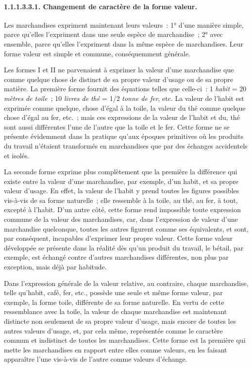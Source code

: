 \documentclass[french,twoside]{book} %
\begin{document}
\paragraph[{1.1.1.3.3.1. Changement de caractère de la forme valeur.}]{1.1.1.3.3.1. Changement de caractère de la forme valeur.}
\noindent Les marchandises expriment maintenant leurs valeurs : 1° d’une manière simple, parce qu’elles l’expriment dans une seule espèce de marchandise ; 2° avec ensemble, parce qu’elles l’expriment dans la même espèce de marchandises. Leur forme valeur est simple et commune, conséquemment générale.\par
Les formes I et II ne parvenaient à exprimer la valeur d’une marchandise que comme quelque chose de distinct de sa propre valeur d’usage ou de sa propre matière. La première forme fournit des équations telles que celle-ci : 1 \emph{habit} = 20 \emph{mètres de toile} ; 10 \emph{livres de thé} = 1/2 \emph{tonne de fer}, etc. La valeur de l’habit est exprimée comme quelque, chose d’égal à la toile, la valeur du thé comme quelque chose d’égal au fer, etc. ; mais ces expressions de la valeur de l’habit et du, thé sont aussi différentes l’une de l’autre que la toile et le fer. Cette forme ne se présente évidemment dans la pratique qu’aux époques primitives où les produits du travail n’étaient transformés en marchandises que par des échanges accidentels et isolés.\par
La seconde forme exprime plus complètement que la première la différence qui existe entre la valeur d’une marchandise, par exemple, d’un habit, et sa propre valeur d’usage. En effet, la valeur de l’habit y prend toutes les figures possibles vis-à-vis de sa forme naturelle ; elle ressemble à la toile, au thé, au fer, à tout, excepté à l’habit. D’un autre côté, cette forme rend impossible toute expression commune de la valeur des marchandises, car, dans l’expression de valeur d’une marchandise quelconque, toutes les autres figurent comme ses équivalents, et sont, par conséquent, incapables d’exprimer leur propre valeur. Cette forme valeur développée se présente dans la réalité dès qu’un produit du travail, le bétail, par exemple, est échangé contre d’autres marchandises différentes, non plus par exception, mais déjà par habitude.\par
Dans l’expression générale de la valeur relative, au contraire, chaque marchandise, telle qu’habit, café, fer, etc., possède une seule et même forme valeur, par exemple, la forme toile, différente de sa forme naturelle. En vertu de cette ressemblance avec la toile, la valeur de chaque marchandise est maintenant distincte non seulement de sa propre valeur d’usage, mais encore de toutes les autres valeurs d’usage, et, par cela même, représentée comme le caractère commun et indistinct de toutes les marchandises. Cette forme est la première qui mette les marchandises en rapport entre elles comme valeurs, en les faisant apparaître l’une vis-à-vis de l’autre comme valeurs d’échange.\par
\end{document}
